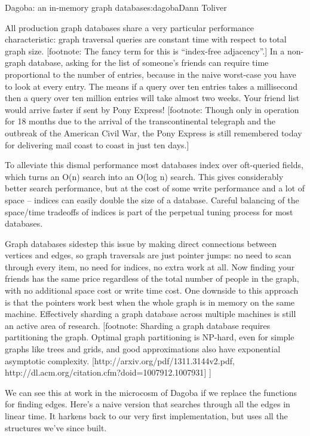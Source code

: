 \begin{aosachapter}{Dagoba: an in-memory graph database}{s:dagoba}{Dann Toliver}
\label{performance}

All production graph databases share a very particular performance
characteristic: graph traversal queries are constant time with respect
to total graph size. {[}footnote: The fancy term for this is
``index-free adjacency''.{]} In a non-graph database, asking for the
list of someone's friends can require time proportional to the number of
entries, because in the naive worst-case you have to look at every
entry. The means if a query over ten entries takes a millisecond then a
query over ten million entries will take almost two weeks. Your friend
list would arrive faster if sent by Pony Express! {[}footnote: Though
only in operation for 18 months due to the arrival of the
transcontinental telegraph and the outbreak of the American Civil War,
the Pony Express is still remembered today for delivering mail coast to
coast in just ten days.{]}

To alleviate this dismal performance most databases index over
oft-queried fields, which turns an O(n) search into an O(log n) search.
This gives considerably better search performance, but at the cost of
some write performance and a lot of space -- indices can easily double
the size of a database. Careful balancing of the space/time tradeoffs of
indices is part of the perpetual tuning process for most databases.

Graph databases sidestep this issue by making direct connections between
vertices and edges, so graph traversals are just pointer jumps: no need
to scan through every item, no need for indices, no extra work at all.
Now finding your friends has the same price regardless of the total
number of people in the graph, with no additional space cost or write
time cost. One downside to this approach is that the pointers work best
when the whole graph is in memory on the same machine. Effectively
sharding a graph database across multiple machines is still an active
area of research. {[}footnote: Sharding a graph database requires
partitioning the graph. Optimal graph partitioning is NP-hard, even for
simple graphs like trees and grids, and good approximations also have
exponential asymptotic complexity.
{[}http://arxiv.org/pdf/1311.3144v2.pdf,
http://dl.acm.org/citation.cfm?doid=1007912.1007931{]} {]}

We can see this at work in the microcosm of Dagoba if we replace the
functions for finding edges. Here's a naive version that searches
through all the edges in linear time. It harkens back to our very first
implementation, but uses all the structures we've since built.


\end{aosachapter}
